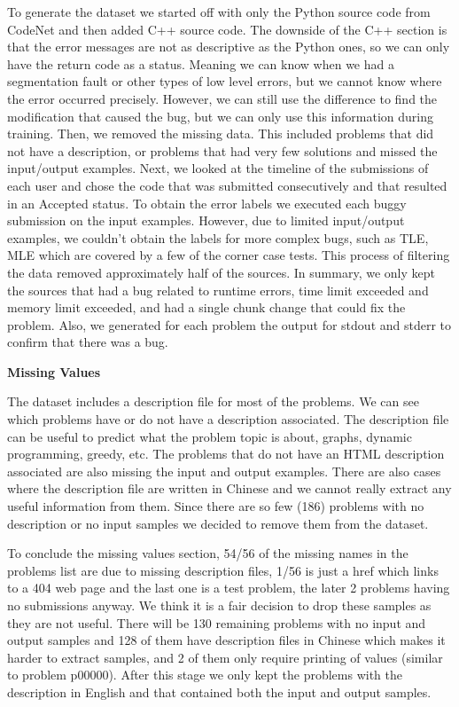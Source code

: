 \documentclass[12pt,a4paper]{report}
\begin{document}
To generate the dataset we started off with only the Python source code from CodeNet and then added C++ source code. The downside of the C++ section is that the error messages are not as descriptive as the Python ones, so we can only have the return code as a status. Meaning we can know when we had a segmentation fault or other types of low level errors, but we cannot know where the error occurred precisely. However, we can still use the difference to find the modification that caused the bug, but we can only use this information during training. Then, we removed the missing data. This included problems that did not have a description, or problems that had very few solutions and missed the input/output examples. Next, we looked at the timeline of the submissions of each user and chose the code that was submitted consecutively and that resulted in an Accepted status. To obtain the error labels we executed each buggy submission on the input examples. However, due to limited input/output examples, we couldn’t obtain the labels for more complex bugs, such as TLE, MLE which are covered by a few of the corner case tests. This process of filtering the data removed approximately half of the sources. In summary, we only kept the sources that had a bug related to runtime errors, time limit exceeded and memory limit exceeded, and had a single chunk change that could fix the problem. Also, we generated for each problem the output for stdout and stderr to confirm that there was a bug.

\textbf{Missing Values}

The dataset includes a description file for most of the problems. We can see which problems have or do not have a description associated. The description file can be useful to predict what the problem topic is about, graphs, dynamic programming, greedy, etc. The problems that do not have an HTML description associated are also missing the input and output examples. There are also cases where the description file are written in Chinese and we cannot really extract any useful information from them. Since there are so few (186) problems with no description or no input samples we decided to remove them from the dataset.

To conclude the missing values section, 54/56 of the missing names in the problems list are due to missing description files, 1/56 is just a href which links to a 404 web page and the last one is a test problem, the later 2 problems having no submissions anyway. We think it is a fair decision to drop these samples as they are not useful. There will be 130 remaining problems with no input and output samples and 128 of them have description files in Chinese which makes it harder to extract samples, and 2 of them only require printing of values (similar to problem p00000). After this stage we only kept the problems with the description in English and that contained both the input and output samples.
\end{document}

